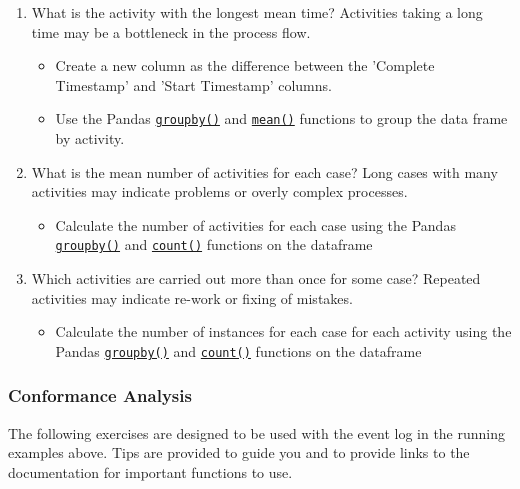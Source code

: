 \begin{withcode}
\begin{exerciseboxcomputer}
\begin{enumerate}
   \item What is the activity with the longest mean time? Activities taking a long time may be a bottleneck in the process flow.
   \begin{itemize}
       \item Create a new column as the difference between the 'Complete Timestamp' and 'Start Timestamp' columns.
       \item Use the Pandas \href{https://pandas.pydata.org/docs/reference/api/pandas.DataFrame.groupby.html}{\texttt{groupby()}} and \href{https://pandas.pydata.org/docs/reference/api/pandas.DataFrame.mean.html}{\texttt{mean()}} functions to group the data frame by activity.
   \end{itemize}
   \item What is the mean number of activities for each case? Long cases with many activities may indicate problems or overly complex processes.
   \begin{itemize}
       \item Calculate the number of activities for each case using the Pandas \href{https://pandas.pydata.org/docs/reference/api/pandas.DataFrame.groupby.html}{\texttt{groupby()}} and \href{https://pandas.pydata.org/docs/reference/api/pandas.DataFrame.count.html}{\texttt{count()}} functions on the dataframe
   \end{itemize}
   \item Which activities are carried out more than once for some case? Repeated activities may indicate re-work or fixing of mistakes.
   \begin{itemize}
       \item Calculate the number of instances for each case for each activity using the Pandas \href{https://pandas.pydata.org/docs/reference/api/pandas.DataFrame.groupby.html}{\texttt{groupby()}} and \href{https://pandas.pydata.org/docs/reference/api/pandas.DataFrame.count.html}{\texttt{count()}} functions on the dataframe
   \end{itemize}
\end{enumerate}
\end{exerciseboxcomputer}

\begin{exerciseboxcomputer}
\subsubsection*{Conformance Analysis}

The following exercises are designed to be used with the event log in the running examples above. Tips are provided to guide you and to provide links to the documentation for important functions to use.


\end{exerciseboxcomputer}
\end{withcode}
